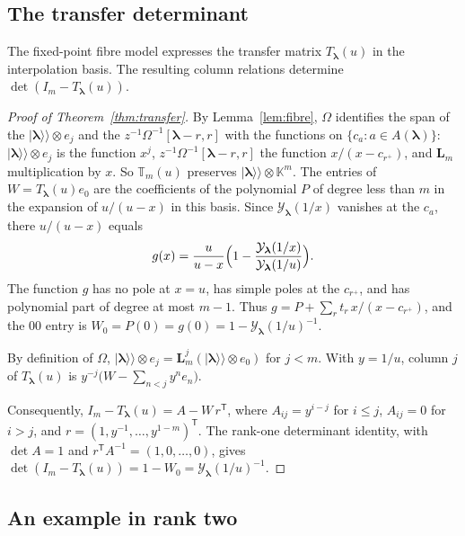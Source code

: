\documentclass[11pt]{amsart}
\theoremstyle{definition}
\theoremstyle{remark}
\newcommand{\K}{\mathbb K}                       %
\newcommand{\bl}{{\boldsymbol{\lambda}}}         %
\newcommand{\Add}[1]{A(#1)}                      %
\newcommand{\CY}{\mathcal Y}
\newcommand{\Yfn}[1]{\CY_{#1}}                   %
\newcommand{\ceig}[1]{c_{#1}}                    %
\newcommand{\bplus}[1]{{#1}^{+}}                 %
\newcommand{\auxe}[1]{e_{#1}}                    %
\newcommand{\kket}[1]{\lvert #1\rangle\!\rangle} %
\newcommand{\pt}[2]{[#1,#2]}                     %
\newcommand{\Omap}{\Omega}                       %
\newcommand{\LL}{\mathbf L}
\newcommand{\Lax}[1]{\LL_{#1}}                   %
\newcommand{\TT}{\mathbb T}
\newcommand{\Transfer}[2]{\TT_{#1}(#2)}          %
\newcommand{\TransferMat}[2]{T_{#1}(#2)}         %
\begin{document}
\subsection{The transfer determinant}\label{sec:transfer}

The fixed-point fibre model expresses the transfer matrix
\(\TransferMat{\bl}{u}\) in the interpolation basis. The resulting column
relations determine \(\det(I_m-\TransferMat{\bl}{u})\).

\begin{proof}[Proof of Theorem~\ref{thm:transfer}]
By Lemma~\ref{lem:fibre}, \(\Omap\) identifies the span of the \(\kket{\bl}\otimes\auxe{j}\) and the
\(z^{-1}\Omap^{-1}\pt{\bl-r}{r}\) with the functions on \(\{\ceig{a}:a\in\Add{\bl}\}\): \(\kket{\bl}\otimes\auxe{j}\) is the
function \(x^j\), \(z^{-1}\Omap^{-1}\pt{\bl-r}{r}\) the function \(x/(x-\ceig{\bplus{r}})\), and \(\Lax{m}\)
multiplication by \(x\). So \(\Transfer{m}{u}\) preserves \(\kket{\bl}\otimes\K^m\).
The entries of \(W=\TransferMat{\bl}{u}\auxe{0}\) are the coefficients of the polynomial
\(P\) of degree less than \(m\) in the expansion of \(u/(u-x)\) in this basis.
Since \(\Yfn{\bl}(1/x)\) vanishes at the \(\ceig{a}\), there \(u/(u-x)\) equals
\[
 g(x)=\frac{u}{u-x}\Bigl(1-\frac{\Yfn{\bl}(1/x)}{\Yfn{\bl}(1/u)}\Bigr).
\]
The function \(g\) has no pole at \(x=u\), has simple poles at the \(\ceig{\bplus{r}}\),
and has polynomial part of degree at most \(m-1\).
Thus \(g=P+\sum_rt_r\,x/(x-\ceig{\bplus{r}})\), and the \(00\) entry is
\(W_0=P(0)=g(0)=1-\Yfn{\bl}(1/u)^{-1}\).

By definition of \(\Omap\), \(\kket{\bl}\otimes\auxe{j}=\Lax{m}^j(\kket{\bl}\otimes\auxe{0})\) for \(j<m\).
With \(y=1/u\), column \(j\) of \(\TransferMat{\bl}{u}\) is
\(y^{-j}\bigl(W-\sum_{n<j}y^n\auxe{n}\bigr)\).

Consequently,
\(I_m-\TransferMat{\bl}{u}=A-W\,r^{\mathsf T}\), where \(A_{ij}=y^{i-j}\) for \(i\leq j\), \(A_{ij}=0\) for \(i>j\), and
\(r=(1,y^{-1},\dots,y^{1-m})^{\mathsf T}\). The rank-one determinant identity,
with \(\det A=1\) and \(r^{\mathsf T}A^{-1}=(1,0,\dots,0)\), gives
\(\det(I_m-\TransferMat{\bl}{u})=1-W_0=\Yfn{\bl}(1/u)^{-1}\).
\end{proof}

\subsection{An example in rank two}\label{sec:example}
\end{document}
